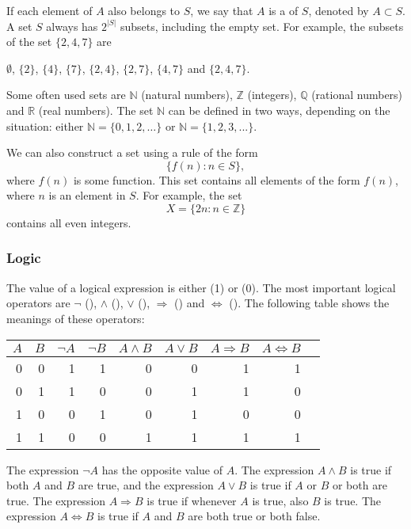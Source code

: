 If each element of $A$ also belongs to $S$,
we say that $A$ is a  of $S$,
denoted by $A \subset S$.
A set $S$ always has $2^{|S|}$ subsets,
including the empty set.
For example, the subsets of the set $\{2,4,7\}$ are
\begin{center}
$\emptyset$,
$\{2\}$, $\{4\}$, $\{7\}$, $\{2,4\}$, $\{2,7\}$, $\{4,7\}$ and $\{2,4,7\}$.
\end{center}

Some often used sets are
$\mathbb{N}$ (natural numbers),
$\mathbb{Z}$ (integers),
$\mathbb{Q}$ (rational numbers) and
$\mathbb{R}$ (real numbers).
The set $\mathbb{N}$
can be defined in two ways, depending
on the situation:
either $\mathbb{N}=\{0,1,2,\ldots\}$
or $\mathbb{N}=\{1,2,3,...\}$.

We can also construct a set using a rule of the form
\[\{f(n) : n \in S\},\]
where $f(n)$ is some function.
This set contains all elements of the form $f(n)$,
where $n$ is an element in $S$.
For example, the set
\[X=\{2n : n \in \mathbb{Z}\}\]
contains all even integers.

\subsubsection{Logic}


The value of a logical expression is either
 (1) or  (0).
The most important logical operators are
$\lnot$ (),
$\land$ (),
$\lor$ (),
$\Rightarrow$ () and
$\Leftrightarrow$ ().
The following table shows the meanings of these operators:

\begin{center}
\begin{tabular}{rr|rrrrrrr}
$A$ & $B$ & $\lnot A$ & $\lnot B$ & $A \land B$ & $A \lor B$ & $A \Rightarrow B$ & $A \Leftrightarrow B$ \\
\hline
0 & 0 & 1 & 1 & 0 & 0 & 1 & 1 \\
0 & 1 & 1 & 0 & 0 & 1 & 1 & 0 \\
1 & 0 & 0 & 1 & 0 & 1 & 0 & 0 \\
1 & 1 & 0 & 0 & 1 & 1 & 1 & 1 \\
\end{tabular}
\end{center}

The expression $\lnot A$ has the opposite value of $A$.
The expression $A \land B$ is true if both $A$ and $B$
are true,
and the expression $A \lor B$ is true if $A$ or $B$ or both
are true.
The expression $A \Rightarrow B$ is true
if whenever $A$ is true, also $B$ is true.
The expression $A \Leftrightarrow B$ is true
if $A$ and $B$ are both true or both false.

